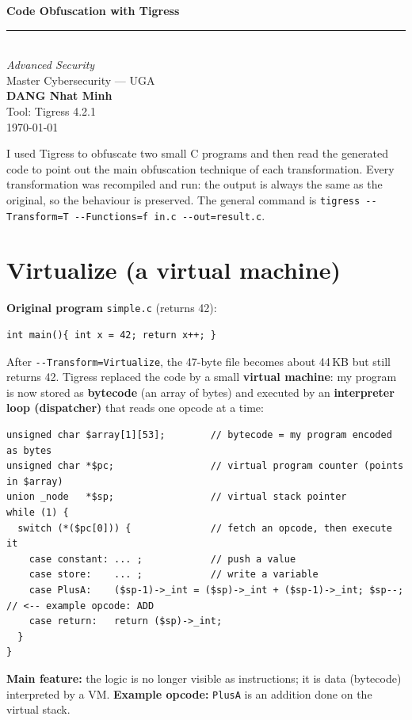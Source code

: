 \documentclass[11pt,a4paper]{article}
\newcommand{\code}[1]{\texttt{\small #1}}
\begin{document}
\thispagestyle{empty}
\vspace*{\fill}
\begin{center}
  {\Huge\bfseries Code Obfuscation with Tigress}\\[20pt]
  \rule{0.55\textwidth}{0.4pt}\\[16pt]
  {\large \textit{Advanced Security}}\\[4pt]
  {\normalsize Master Cybersecurity --- UGA}\\[28pt]
  {\Large \textbf{DANG Nhat Minh}}\\[10pt]
  {\small Tool: Tigress 4.2.1}\\[4pt]
  {\small \today}
\end{center}
\vspace*{\fill}
\newpage

I used Tigress to obfuscate two small C programs and then read the generated code to point out
the main obfuscation technique of each transformation. Every transformation was recompiled and run:
the output is always the same as the original, so the behaviour is preserved. The general command is
\code{tigress -{}-Transform=T -{}-Functions=f in.c -{}-out=result.c}.

\section{Virtualize (a virtual machine)}
\textbf{Original program} \code{simple.c} (returns 42):
\begin{lstlisting}[style=base]
int main(){ int x = 42; return x++; }
\end{lstlisting}
After \code{-{}-Transform=Virtualize}, the 47-byte file becomes about 44\,KB but still returns 42.
Tigress replaced the code by a small \textbf{virtual machine}: my program is now stored as
\textbf{bytecode} (an array of bytes) and executed by an \textbf{interpreter loop (dispatcher)} that
reads one opcode at a time:
\begin{lstlisting}
unsigned char $array[1][53];        // bytecode = my program encoded as bytes
unsigned char *$pc;                 // virtual program counter (points in $array)
union _node   *$sp;                 // virtual stack pointer
while (1) {
  switch (*($pc[0])) {              // fetch an opcode, then execute it
    case constant: ... ;            // push a value
    case store:    ... ;            // write a variable
    case PlusA:    ($sp-1)->_int = ($sp)->_int + ($sp-1)->_int; $sp--;  // <-- example opcode: ADD
    case return:   return ($sp)->_int;
  }
}
\end{lstlisting}
\textbf{Main feature:} the logic is no longer visible as instructions; it is data (bytecode)
interpreted by a VM. \textbf{Example opcode:} \code{PlusA} is an addition done on the virtual stack.
\end{document}
